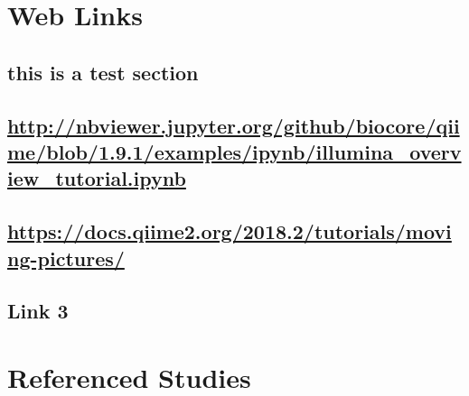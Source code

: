 %
\begin{appendix}
\chapter{Web Links}
    \section{this is a test section}
    \label{test-label}
    \section{\url{http://nbviewer.jupyter.org/github/biocore/qiime/blob/1.9.1/examples/ipynb/illumina_overview_tutorial.ipynb}}
    \label{appendix:IlluminaOverTut}
    \section{\url{https://docs.qiime2.org/2018.2/tutorials/moving-pictures/}}
    \label{appendix:MovingPicTut}
    \section*{Link 3}

\chapter{Referenced Studies}
\end{appendix}
%

%




